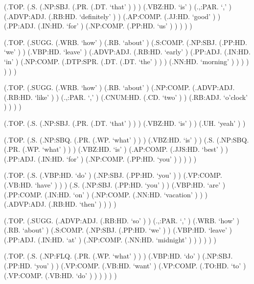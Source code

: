 \documentclass[10pt]{article}
\begin{document}
\begin{parsetree}  (.TOP. (.S. (.NP:SBJ. (.PR. (.DT. `that' ) ) ) (.VBZ:HD. `is' ) (.,:PAR. `,' ) (.ADVP:ADJ. (.RB:HD. `definitely' ) ) (.AP:COMP. (.JJ:HD. `good' ) ) (.PP:ADJ. (.IN:HD. `for' ) (.NP:COMP. (.PP:HD. `us' ) ) ) ) ) \end{parsetree}

\begin{parsetree}  (.TOP. (.SUGG. (.WRB. `how' ) (.RB. `about' ) (.S:COMP. (.NP:SBJ. (.PP:HD. `we' ) ) (.VBP:HD. `leave' ) (.ADVP:ADJ. (.RB:HD. `early' ) (.PP:ADJ. (.IN:HD. `in' ) (.NP:COMP. (.DTP:SPR. (.DT. (.DT. `the' ) ) ) (.NN:HD. `morning' ) ) ) ) ) ) ) \end{parsetree}

\begin{parsetree}  (.TOP. (.SUGG. (.WRB. `how' ) (.RB. `about' ) (.NP:COMP. (.ADVP:ADJ. (.RB:HD. `like' ) ) (.,:PAR. `,' ) (.CNUM:HD. (.CD. `two' ) ) (.RB:ADJ. `o'clock' ) ) ) ) \end{parsetree}

\begin{parsetree}  (.TOP. (.S. (.NP:SBJ. (.PR. (.DT. `that' ) ) ) (.VBZ:HD. `is' ) ) (.UH. `yeah' ) ) \end{parsetree}

\begin{parsetree}  (.TOP. (.S. (.NP:SBQ. (.PR. (.WP. `what' ) ) ) (.VBZ:HD. `is' ) ) (.S. (.NP:SBQ. (.PR. (.WP. `what' ) ) ) (.VBZ:HD. `is' ) (.AP:COMP. (.JJS:HD. `best' ) ) (.PP:ADJ. (.IN:HD. `for' ) (.NP:COMP. (.PP:HD. `you' ) ) ) ) ) \end{parsetree}

\begin{parsetree}  (.TOP. (.S. (.VBP:HD. `do' ) (.NP:SBJ. (.PP:HD. `you' ) ) (.VP:COMP. (.VB:HD. `have' ) ) ) (.S. (.NP:SBJ. (.PP:HD. `you' ) ) (.VBP:HD. `are' ) (.PP:COMP. (.IN:HD. `on' ) (.NP:COMP. (.NN:HD. `vacation' ) ) ) (.ADVP:ADJ. (.RB:HD. `then' ) ) ) ) \end{parsetree}

\begin{parsetree}  (.TOP. (.SUGG. (.ADVP:ADJ. (.RB:HD. `so' ) ) (.,:PAR. `,' ) (.WRB. `how' ) (.RB. `about' ) (.S:COMP. (.NP:SBJ. (.PP:HD. `we' ) ) (.VBP:HD. `leave' ) (.PP:ADJ. (.IN:HD. `at' ) (.NP:COMP. (.NN:HD. `midnight' ) ) ) ) ) ) \end{parsetree}

\begin{parsetree}  (.TOP. (.S. (.NP:FLQ. (.PR. (.WP. `what' ) ) ) (.VBP:HD. `do' ) (.NP:SBJ. (.PP:HD. `you' ) ) (.VP:COMP. (.VB:HD. `want' ) (.VP:COMP. (.TO:HD. `to' ) (.VP:COMP. (.VB:HD. `do' ) ) ) ) ) ) \end{parsetree}
\end{document}
